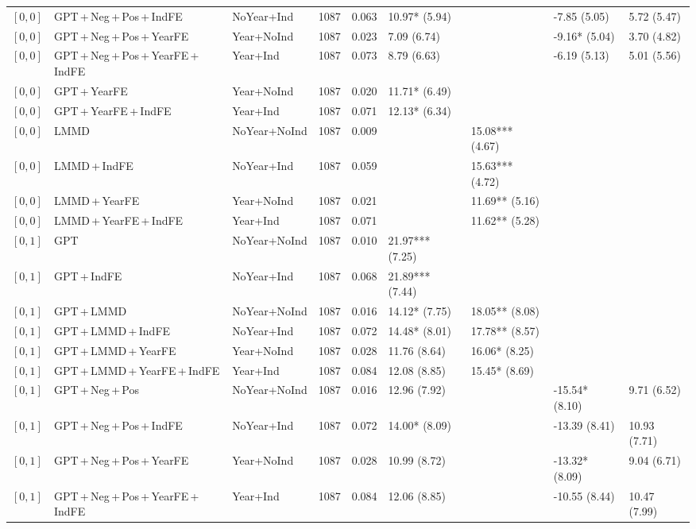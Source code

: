 \begin{table}[p]
\begin{tabular}{lllrrllll}
$[0,0]$ & GPT\,+\,Neg\,+\,Pos\,+\,IndFE & NoYear+Ind & 1087 & 0.063 & 10.97* (5.94) &  & -7.85 (5.05) & 5.72 (5.47) \\
$[0,0]$ & GPT\,+\,Neg\,+\,Pos\,+\,YearFE & Year+NoInd & 1087 & 0.023 & 7.09 (6.74) &  & -9.16* (5.04) & 3.70 (4.82) \\
$[0,0]$ & GPT\,+\,Neg\,+\,Pos\,+\,YearFE\,+\,IndFE & Year+Ind & 1087 & 0.073 & 8.79 (6.63) &  & -6.19 (5.13) & 5.01 (5.56) \\
$[0,0]$ & GPT\,+\,YearFE & Year+NoInd & 1087 & 0.020 & 11.71* (6.49) &  &  &  \\
$[0,0]$ & GPT\,+\,YearFE\,+\,IndFE & Year+Ind & 1087 & 0.071 & 12.13* (6.34) &  &  &  \\
$[0,0]$ & LMMD & NoYear+NoInd & 1087 & 0.009 &  & 15.08*** (4.67) &  &  \\
$[0,0]$ & LMMD\,+\,IndFE & NoYear+Ind & 1087 & 0.059 &  & 15.63*** (4.72) &  &  \\
$[0,0]$ & LMMD\,+\,YearFE & Year+NoInd & 1087 & 0.021 &  & 11.69** (5.16) &  &  \\
$[0,0]$ & LMMD\,+\,YearFE\,+\,IndFE & Year+Ind & 1087 & 0.071 &  & 11.62** (5.28) &  &  \\
$[0,1]$ & GPT & NoYear+NoInd & 1087 & 0.010 & 21.97*** (7.25) &  &  &  \\
$[0,1]$ & GPT\,+\,IndFE & NoYear+Ind & 1087 & 0.068 & 21.89*** (7.44) &  &  &  \\
$[0,1]$ & GPT\,+\,LMMD & NoYear+NoInd & 1087 & 0.016 & 14.12* (7.75) & 18.05** (8.08) &  &  \\
$[0,1]$ & GPT\,+\,LMMD\,+\,IndFE & NoYear+Ind & 1087 & 0.072 & 14.48* (8.01) & 17.78** (8.57) &  &  \\
$[0,1]$ & GPT\,+\,LMMD\,+\,YearFE & Year+NoInd & 1087 & 0.028 & 11.76 (8.64) & 16.06* (8.25) &  &  \\
$[0,1]$ & GPT\,+\,LMMD\,+\,YearFE\,+\,IndFE & Year+Ind & 1087 & 0.084 & 12.08 (8.85) & 15.45* (8.69) &  &  \\
$[0,1]$ & GPT\,+\,Neg\,+\,Pos & NoYear+NoInd & 1087 & 0.016 & 12.96 (7.92) &  & -15.54* (8.10) & 9.71 (6.52) \\
$[0,1]$ & GPT\,+\,Neg\,+\,Pos\,+\,IndFE & NoYear+Ind & 1087 & 0.072 & 14.00* (8.09) &  & -13.39 (8.41) & 10.93 (7.71) \\
$[0,1]$ & GPT\,+\,Neg\,+\,Pos\,+\,YearFE & Year+NoInd & 1087 & 0.028 & 10.99 (8.72) &  & -13.32* (8.09) & 9.04 (6.71) \\
$[0,1]$ & GPT\,+\,Neg\,+\,Pos\,+\,YearFE\,+\,IndFE & Year+Ind & 1087 & 0.084 & 12.06 (8.85) &  & -10.55 (8.44) & 10.47 (7.99) \\

\end{tabular}
\end{table}
